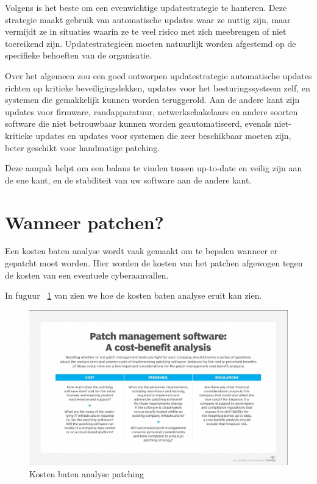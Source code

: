 Volgens \textcite{Tozzi2017} is het beste om een evenwichtige updatestrategie te hanteren. Deze strategie maakt gebruik van automatische updates waar ze nuttig zijn, maar vermijdt ze in situaties waarin ze te veel risico met zich meebrengen
 of niet toereikend zijn. Updatestrategieën moeten natuurlijk worden afgestemd op de specifieke behoeften van de organisatie.

Over het algemeen zou een goed ontworpen updatestrategie automatische updates richten op kritieke beveiligingslekken, updates voor het besturingssysteem zelf, en systemen die gemakkelijk kunnen worden teruggerold. Aan de andere kant 
zijn updates voor firmware, randapparatuur, netwerkschakelaars en andere soorten software die niet betrouwbaar kunnen worden geautomatiseerd, evenals niet-kritieke updates en updates voor systemen die zeer beschikbaar moeten zijn, beter geschikt voor handmatige patching.

Deze aanpak helpt om een balans te vinden tussen up-to-date en veilig zijn aan de ene kant, en de stabiliteit van uw software aan de andere kant.

\section{Wanneer patchen?}
Een kosten baten analyse wordt vaak gemaakt om te bepalen wanneer er gepatcht moet worden. Hier worden de kosten van het patchen afgewogen tegen de kosten van een eventuele cyberaanvallen.

In fuguur ~\ref{fig:kostenbaten} van \textcite{Posey2024} zien we hoe de kosten baten analyse eruit kan zien.

\begin{figure}[h]
    \centering
    \includegraphics[width=\textwidth]{techtarget.jpg}
    \caption{Kosten baten analyse patching \autocite{Posey2024}}
    \label{fig:kostenbaten}
\end{figure}

